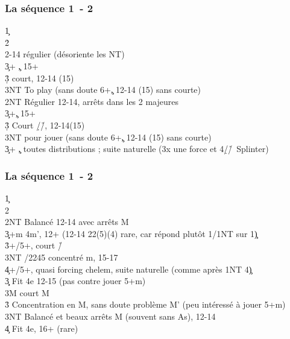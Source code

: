 \documentclass[a4paper]{article}
\begin{document}
\subsubsection{La séquence 1\pdfc\ - 2\pdfh}

\begin{bidtable}
1\c\+\\
2\h\+\\
2\s {}-14 régulier (désoriente les NT)\+\\
3\c {}+ \c , 15+\\
3\d\h\s \> court, 12-14 (15)\\
3NT \> To play (sans doute 6+\c , 12-14 (15) sans courte)\-\\
2NT \> Régulier 12-14, arrêts dans les 2 majeures\+\\
3\c {}+\c , 15+\\
3\d\h\s \> Court \d /\h /\s , 12-14(15)\\
3NT \> pour jouer (sans doute 6+\c , 12-14 (15) sans courte)\-\\
3\c {}+ \c , toutes distributions ; suite naturelle (3x une force et 4\d /\h /\s\ Splinter)\-\-
\end{bidtable}

\subsubsection{La séquence 1\pdfc\ - 2\pdfs}

\begin{bidtable}
1\c\+\\
2\s\+\\
2NT \> Balancé 12-14 avec arrêts M\+\\
3\c\d {}+m 4m', 12+ (12-14 22(5)(4) rare, car répond plutôt 1\s /1NT sur 1\c )\\
3\h\s {}+/5+, court \h /\s \\
3NT /2245 concentré m, 15-17\\
4\c {}+/5+, quasi forcing chelem, suite naturelle (comme après 1NT 4\c )\-\\
3\c\d \> Fit 4e 12-15 (pas contre jouer 5+m)\+\\
3M \> court M\-\\
3\h\s \> Concentration en M, sans doute problème M' (peu intéressé à jouer 5+m)\\
3NT \> Balancé et beaux arrêts M (souvent sans As), 12-14\\
4\c \> Fit 4e, 16+ (rare)\-\-
\end{bidtable}
\end{document}
